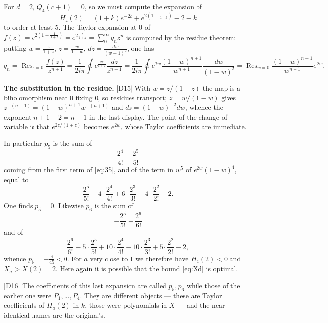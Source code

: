 \documentclass[11pt,reqno]{amsart}
\theoremstyle{plain}
\theoremstyle{definition}
\theoremstyle{remark}
\DeclareMathOperator{\Res}{Res}
\newcommand{\Ledger}[1]{{\scriptsize\textsf{[#1]}}}
\begin{document}
For $d=2$, $Q_4(c+1)=0$, so we must compute the expansion of
\begin{equation}\label{eq:35}
 H_a(2)=(1+k)e^{-2k}+e^{2(1-\frac1{1+k})}-2-k
\end{equation}
to order at least 5. The Taylor expansion at $0$ of
$f(z)=e^{2(1-\frac1{1+z})}=e^{2\frac{z}{1+z}}=\sum_0^\infty q_nz^n$ is computed by the
residue theorem: putting $w=\frac z{1+z}$, $z=\frac w{1-w}$,
$dz=\frac{dw}{(w-1)^2}$, one has
\[q_n=\Res_{z=0}\frac{f(z)}{z^{n+1}}
 =\frac1{2i\pi}\oint e^{\frac{2z}{1+z}}\frac{dz}{z^{n+1}}
 =\frac1{2i\pi}\oint e^{2w}\frac{(1-w)^{n+1}}{w^{n+1}}\frac{dw}{(1-w)^2}
 =\Res_{w=0}\frac{(1-w)^{n-1}}{w^{n+1}}e^{2w} .\]
\begin{expansion}
\textbf{The substitution in the residue.} \Ledger{D15} With $w=z/(1+z)$ the map is a
biholomorphism near $0$ fixing $0$, so residues transport; $z=w/(1-w)$ gives
$z^{-(n+1)}=(1-w)^{n+1}w^{-(n+1)}$ and $dz=(1-w)^{-2}dw$, whence the exponent
$n+1-2=n-1$ in the last display. The point of the change of variable is that
$e^{2z/(1+z)}$ becomes $e^{2w}$, whose Taylor coefficients are immediate.
\end{expansion}

In particular $p_5$ is the sum of
\begin{equation}\label{eq:36}
 \frac{2^4}{4!}-\frac{2^5}{5!}
\end{equation}
coming from the first term of \eqref{eq:35}, and of the term in $w^5$ of
$e^{2w}(1-w)^4$, equal to
\begin{equation}\label{eq:37}
 \frac{2^5}{5!}-4\cdot\frac{2^4}{4!}+6\cdot\frac{2^3}{3!}-4\cdot\frac{2^2}{2!}+2 .
\end{equation}
One finds $p_5=0$. Likewise $p_6$ is the sum of
\begin{equation}\label{eq:38}
 -\frac{2^5}{5!}+\frac{2^6}{6!}
\end{equation}
and of
\begin{equation}\label{eq:39}
 \frac{2^6}{6!}-5\cdot\frac{2^5}{5!}+10\cdot\frac{2^4}{4!}-10\cdot\frac{2^3}{3!}
 +5\cdot\frac{2^2}{2!}-2,
\end{equation}
whence $p_6=-\tfrac4{45}<0$. For $a$ very close to 1 we therefore have $H_a(2)<0$ and
$X_a>X(2)=2$. Here again it is possible that the bound \eqref{eq:Xd} is optimal.

\begin{ournotation}
\Ledger{D16} The coefficients of this last expansion are called $p_5,p_6$ while those
of the earlier one were $P_1,\dots,P_4$. They are different objects --- these are
Taylor coefficients of $H_a(2)$ in $k$, those were polynomials in $X$ --- and the
near-identical names are the original's.
\end{ournotation}
\end{document}
